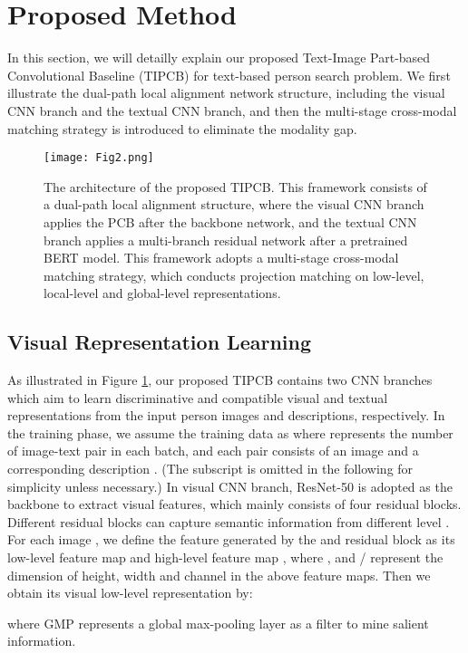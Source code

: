 \documentclass[review]{elsarticle}
\begin{document}
\section{Proposed Method}
In this section, we will detailly explain our proposed Text-Image Part-based Convolutional Baseline (TIPCB) for text-based person search problem. We first illustrate the dual-path local alignment network structure, including the visual CNN branch and the textual CNN branch, and then the multi-stage cross-modal matching strategy is introduced to eliminate the modality gap.

\begin{figure}[!t]
\centering
\texttt{[image: Fig2.png]}\\
\caption{The architecture of the proposed TIPCB. This framework consists of a dual-path local alignment structure, where the visual CNN branch applies the PCB after the backbone network, and the textual CNN branch applies a multi-branch residual network after a pretrained BERT model. This framework adopts a multi-stage cross-modal matching strategy, which conducts projection matching on low-level, local-level and global-level representations.}
\label{fig2}
\end{figure}

\subsection{Visual Representation Learning}
As illustrated in Figure \ref{fig2}, our proposed TIPCB contains two CNN branches which aim to learn discriminative and compatible visual and textual representations from the input person images and descriptions, respectively. In the training phase, we assume the training data as  where  represents the number of image-text pair in each batch, and each pair consists of an image  and a corresponding description . (The subscript  is omitted in the following for simplicity unless necessary.)
In visual CNN branch, ResNet-50 \cite{47} is adopted as the backbone to extract visual features, which mainly consists of four residual blocks. Different residual blocks can capture semantic information from different level \cite{48}. For each image , we define the feature generated by the  and  residual block as its low-level feature map  and high-level feature map , where ,  and / represent the dimension of height, width and channel in the above feature maps. Then we obtain its visual low-level representation  by:

where GMP represents a global max-pooling layer as a filter to mine salient information. 
\end{document}
